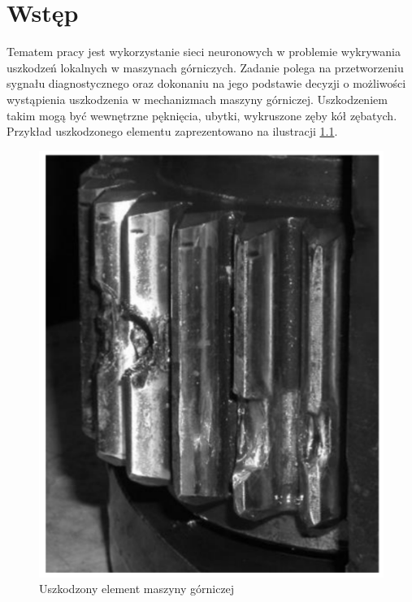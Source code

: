 \documentclass[inzynierska]{pwr_wmat_praca_dyplomowa}
\theoremstyle{plain}
\numberwithin{theorem}{chapter}
\theoremstyle{definition}
\numberwithin{theorem}{chapter}
\begin{document}
\frontmatter
\maketitle
\mainmatter
\tableofcontents



{\backmatter \chapter{Wstęp}}

Tematem pracy jest wykorzystanie sieci neuronowych w problemie wykrywania uszkodzeń lokalnych w maszynach górniczych. Zadanie polega na przetworzeniu sygnału diagnostycznego oraz dokonaniu na jego podstawie decyzji o możliwości wystąpienia uszkodzenia w mechanizmach maszyny górniczej. Uszkodzeniem takim mogą być wewnętrzne pęknięcia, ubytki, wykruszone zęby kół zębatych. Przykład uszkodzonego elementu zaprezentowano na ilustracji \ref{uszkodzenie}.
\begin{figure}[ht]
	
	\centering
	
	\includegraphics[scale=0.5]{images/uszkodzenie_kolko.png}
	\caption{Uszkodzony element maszyny górniczej}
	\label{uszkodzenie}
\end{figure}
\end{document}
